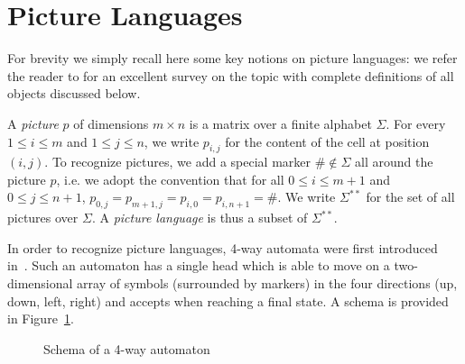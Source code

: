 \documentclass[runningheads, envcountsame, a4paper]{llncs}
\newcommand*{\ie}{i.e.\xspace}
\newcommand*{\bomark}{\#}
\newcommand*{\alphabet}{\Sigma}
\newcommand*{\picturesof}[1]{{#1}^{**}}
\begin{document}
\section{Picture Languages} \label{4wayAutomata}

For brevity we simply recall here some key notions on picture languages: we
refer the reader to \cite{GiammarresiRestivo92} for an excellent survey on
the topic with complete definitions of all objects discussed below.

A \emph{picture} $p$ of dimensions $m \times n$ is a matrix over a finite
alphabet $\alphabet$. For every $1\leq i\leq m$ and $1\leq j\leq n$, we
write $p_{i,j}$ for the content of the cell at position $(i,j)$. To
recognize pictures, we add a special marker $\bomark\notin\alphabet$ all
around the picture $p$, \ie we adopt the convention that for all $0 \leq i
\leq m+1$ and $0 \leq j \leq n+1$, $p_{0,j} = p_{m+1,j} = p_{i,0} = p_{i,
  n+1} = \bomark$.  We write $\picturesof{\alphabet}$ for the set of all
pictures over $\alphabet$. A \emph{picture language} is thus a subset of
$\picturesof{\alphabet}$.

In order to recognize picture languages, 4-way automata were first
introduced in~\cite{BlumHewitt67}. Such an automaton has a single head
which is able to move on a two-dimensional array of symbols (surrounded by
markers) in the four directions (up, down, left, right) and accepts when
reaching a final state. A schema is provided in Figure~\ref{schema4wfa}.

\begin{figure}[ht]
  \centering
  \caption{Schema of a 4-way automaton}
  \label{schema4wfa}
\end{figure}
\end{document}
